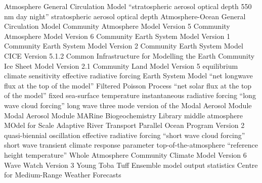 \documentclass[draft]{agujournal2019}
\begin{document}
\begin{acronyms}
Atmosphere General Circulation Model
``stratospheric aerosol optical depth 550 nm day night''
stratospheric aerosol optical depth
Atmosphere-Ocean General Circulation Model
Community Atmosphere Model Version 5
Community Atmosphere Model Version 6
Community Earth System Model Version 1
Community Earth System Model Version 2
Community Earth System Model
CICE Version 5.1.2
Common Infrastructure for Modelling the Earth
Community Ice Sheet Model Version 2.1
Community Land Model Version 5
equilibrium climate sensitivity
effective radiative forcing
Earth System Model
``net longwave flux at the top of the model''
Filtered Poisson Process
``net solar flux at the top of the model''
fixed sea-surface temperature
instantaneous radiative forcing
``long wave cloud forcing''
long wave
three mode version of the Modal Aerosol Module
Modal Aerosol Module
MARine Biogeochemistry Library
middle atmosphere
MOdel for Scale Adaptive River Transport
Parallel Ocean Program Version 2
quasi-biennial oscillation
effective radiative forcing
``short wave cloud forcing''
short wave
transient climate response parameter
top-of-the-atmosphere
``reference height temperature''
Whole Atmosphere Community Climate Model Version 6
Wave Watch Version 3
Young Toba Tuff
Ensemble model output statistics
Centre for Medium-Range Weather Forecasts
\end{acronyms}
\end{document}
